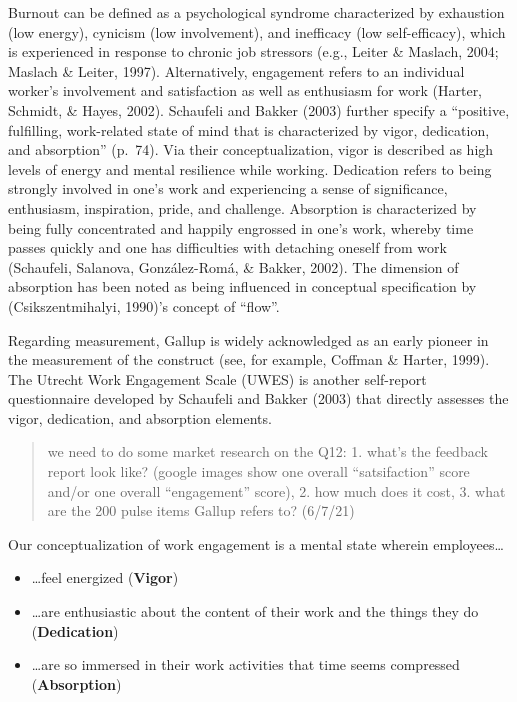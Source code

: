 \documentclass[
  english,
  man]{apa6}
\providecommand{\tightlist}{%
  \setlength{\itemsep}{0pt}\setlength{\parskip}{0pt}}
\begin{document}
Burnout can be defined as a psychological syndrome characterized by exhaustion (low energy), cynicism (low involvement), and inefficacy (low self-efficacy), which is experienced in response to chronic job stressors (e.g., Leiter \& Maslach, 2004; Maslach \& Leiter, 1997). Alternatively, engagement refers to an individual worker's involvement and satisfaction as well as enthusiasm for work (Harter, Schmidt, \& Hayes, 2002). Schaufeli and Bakker (2003) further specify a \enquote{positive, fulfilling, work-related state of mind that is characterized by vigor, dedication, and absorption} (p.~74). Via their conceptualization, vigor is described as high levels of energy and mental resilience while working. Dedication refers to being strongly involved in one's work and experiencing a sense of significance, enthusiasm, inspiration, pride, and challenge. Absorption is characterized by being fully concentrated and happily engrossed in one's work, whereby time passes quickly and one has difficulties with detaching oneself from work (Schaufeli, Salanova, González-Romá, \& Bakker, 2002). The dimension of absorption has been noted as being influenced in conceptual specification by (Csikszentmihalyi, 1990)'s concept of \enquote{flow}.

Regarding measurement, Gallup is widely acknowledged as an early pioneer in the measurement of the construct (see, for example, Coffman \& Harter, 1999). The Utrecht Work Engagement Scale (UWES) is another self-report questionnaire developed by Schaufeli and Bakker (2003) that directly assesses the vigor, dedication, and absorption elements.

\begin{quote}
we need to do some market research on the Q12: 1. what's the feedback report look like? (google images show one overall \enquote{satsifaction} score and/or one overall \enquote{engagement} score), 2. how much does it cost, 3. what are the 200 pulse items Gallup refers to? (6/7/21)
\end{quote}

Our conceptualization of work engagement is a mental state wherein employees\ldots{}

\begin{itemize}
\tightlist
\item
  \ldots feel energized (\textbf{Vigor})
\item
  \ldots are enthusiastic about the content of their work and the things they do (\textbf{Dedication})
\item
  \ldots are so immersed in their work activities that time seems compressed (\textbf{Absorption})
\end{itemize}
\end{document}
